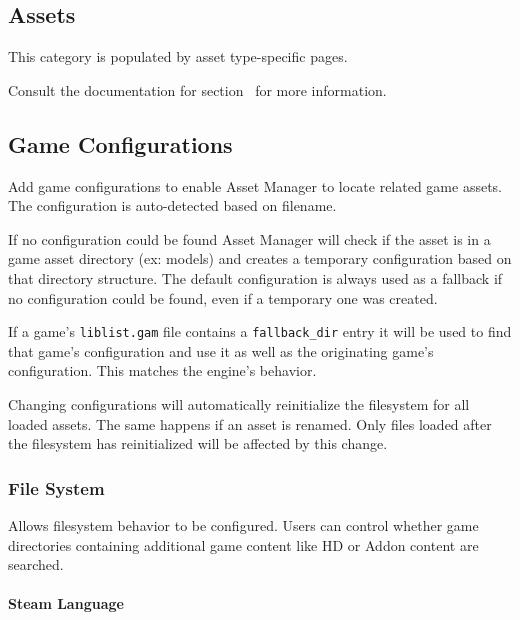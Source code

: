 \documentclass[10pt, a4paper, titlepage, oneside]{article}
\newcommand{\code}[1]{\mbox{\texttt{#1}}}
\begin{document}
\newpage

\subsection{Assets}

This category is populated by asset type-specific pages.

Consult the documentation for section~ for more information.

\subsection{Game Configurations}
\label{sec:game_configurations}

Add game configurations to enable Asset Manager to locate related game assets.
The configuration is auto-detected based on filename.

\vspace{\baselineskip}
If no configuration could be found Asset Manager will check if the asset is in a game asset directory (ex: models) and creates a temporary configuration based on that directory structure.
The default configuration is always used as a fallback if no configuration could be found, even if a temporary one was created.

\vspace{\baselineskip}
If a game's \code{liblist.gam} file contains a \code{fallback\_dir} entry it will be used to find that game's configuration and use it as well as the originating game's configuration. This matches the engine's behavior.

\vspace{\baselineskip}
Changing configurations will automatically reinitialize the filesystem for all loaded assets. The same happens if an asset is renamed. Only files loaded after the filesystem has reinitialized will be affected by this change.

\subsubsection{File System}

Allows filesystem behavior to be configured. Users can control whether game directories containing additional game content like HD or Addon content are searched.

\paragraph{Steam Language}
\end{document}
